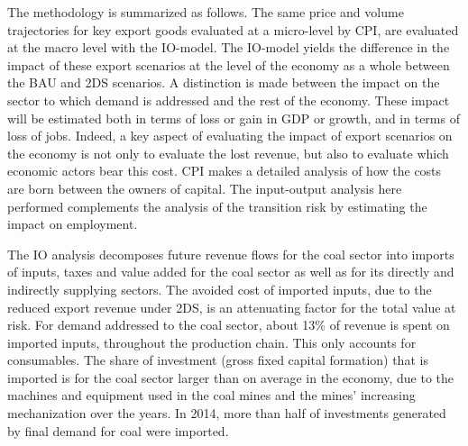 \documentclass[12pt,english]{article}
\begin{document}

The methodology is summarized as follows. The same price and volume trajectories for key export goods %
evaluated at a micro-level by CPI, are evaluated at the macro level with the IO-model. The IO-model yields the difference in the impact of these export scenarios at the level of the economy as a whole between the BAU and 2DS scenarios. A distinction is made between the impact on the sector to which demand is addressed and the rest of the economy. %
These impact will be estimated both in terms of loss or gain in GDP or growth, and in terms of loss of jobs. Indeed, a key aspect of evaluating the impact of export scenarios on the economy is not only to evaluate the lost revenue, but also to evaluate which economic actors bear this cost. CPI makes a detailed analysis of how the costs are born between the owners of capital. %
The input-output analysis here performed complements the analysis of the transition risk by estimating the impact on employment. 

The IO analysis decomposes future revenue flows for the coal sector into imports of inputs, taxes and value added for the coal sector as well as for its directly and indirectly supplying sectors. The avoided cost of imported inputs, due to the reduced export revenue under 2DS, is an attenuating factor for the total value at risk. For demand addressed to the coal sector, about 13\% of revenue is spent on imported inputs, throughout the production chain. This only accounts for consumables. The share of investment (gross fixed capital formation) that is imported is for the coal sector larger than on average in the economy, due to the machines and equipment used in the coal mines and the mines' increasing mechanization over the years. In 2014, more than half of investments generated by final demand for coal were imported.


\end{document}
